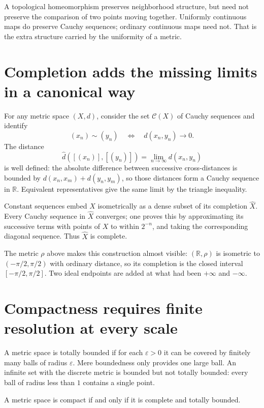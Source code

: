 A topological homeomorphism preserves neighborhood structure, but need not preserve the comparison of two points moving together. Uniformly continuous maps do preserve Cauchy sequences; ordinary continuous maps need not. That is the extra structure carried by the uniformity of a metric.

\section{Completion adds the missing limits in a canonical way}

For any metric space \((X,d)\), consider the set \(\mathcal C(X)\) of Cauchy sequences and identify
\[
 (x_n)\sim(y_n)\quad\Longleftrightarrow\quad d(x_n,y_n)\to0.
\]
The distance
\[
 \widehat d([(x_n)],[(y_n)])
   =\lim_{n\to\infty}d(x_n,y_n)
\]
is well defined: the absolute difference between successive cross-distances is bounded by
\(d(x_n,x_m)+d(y_n,y_m)\), so those distances form a Cauchy sequence in \(\mathbb R\). Equivalent representatives give the same limit by the triangle inequality.

Constant sequences embed \(X\) isometrically as a dense subset of its completion \(\widehat X\). Every Cauchy sequence in \(\widehat X\) converges; one proves this by approximating its successive terms with points of \(X\) to within \(2^{-n}\), and taking the corresponding diagonal sequence. Thus \(\widehat X\) is complete.

The metric \(\rho\) above makes this construction almost visible: \((\mathbb R,\rho)\) is isometric to \((-\pi/2,\pi/2)\) with ordinary distance, so its completion is the closed interval \([-\pi/2,\pi/2]\). Two ideal endpoints are added at what had been \(+\infty\) and \(-\infty\).

\section{Compactness requires finite resolution at every scale}

A metric space is totally bounded if for each \(\varepsilon>0\) it can be covered by finitely many balls of radius \(\varepsilon\). Mere boundedness only provides one large ball. An infinite set with the discrete metric is bounded but not totally bounded: every ball of radius less than \(1\) contains a single point.

\begin{theorem}
A metric space is compact if and only if it is complete and totally bounded.
\end{theorem}

